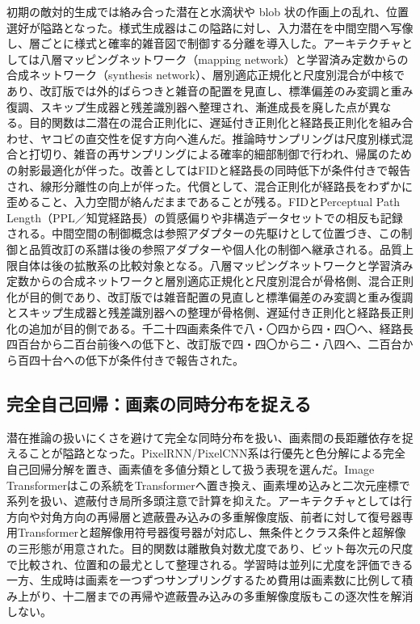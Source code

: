 \documentclass[lualatex,a4paper,10pt]{jlreq}
\begin{document}
初期の敵対的生成では絡み合った潜在と水滴状や blob 状の作画上の乱れ、位置選好が隘路となった。様式生成器はこの隘路に対し、入力潜在を中間空間へ写像し、層ごとに様式と確率的雑音図で制御する分離を導入した\autocite{btd015}。アーキテクチャとしては八層マッピングネットワーク（mapping network）と学習済み定数からの合成ネットワーク（synthesis network）、層別適応正規化と尺度別混合が中核であり、改訂版では外的ばらつきと雑音の配置を見直し、標準偏差のみ変調と重み復調、スキップ生成器と残差識別器へ整理され、漸進成長を廃した点が異なる\autocite{btd016}。目的関数は二潜在の混合正則化に、遅延付き正則化と経路長正則化を組み合わせ、ヤコビの直交性を促す方向へ進んだ\autocite{btd015,btd016}。推論時サンプリングは尺度別様式混合と打切り、雑音の再サンプリングによる確率的細部制御で行われ、帰属のための射影最適化が伴った\autocite{btd015}。改善としてはFIDと経路長の同時低下が条件付きで報告され、線形分離性の向上が伴った\autocite{btd015,btd016}。代償として、混合正則化が経路長をわずかに歪めること、入力空間が絡んだままであることが残る。FIDとPerceptual Path Length（PPL／知覚経路長）の質感偏りや非構造データセットでの相反も記録される。中間空間の制御概念は参照アダプターの先駆けとして位置づき、この制御と品質改訂の系譜は後の参照アダプターや個人化の制御へ継承される。品質上限自体は後の拡散系の比較対象となる。八層マッピングネットワークと学習済み定数からの合成ネットワークと層別適応正規化と尺度別混合が骨格側、混合正則化が目的側であり、改訂版では雑音配置の見直しと標準偏差のみ変調と重み復調とスキップ生成器と残差識別器への整理が骨格側、遅延付き正則化と経路長正則化の追加が目的側である\autocite{btd015,btd016}。千二十四画素条件で八・〇四から四・四〇へ、経路長四百台から二百台前後への低下と、改訂版で四・四〇から二・八四へ、二百台から百四十台への低下が条件付きで報告された\autocite{btd015,btd016}。

\subsection{完全自己回帰：画素の同時分布を捉える}
潜在推論の扱いにくさを避けて完全な同時分布を扱い、画素間の長距離依存を捉えることが隘路となった。PixelRNN/PixelCNN系は行優先と色分解による完全自己回帰分解を置き、画素値を多値分類として扱う表現を選んだ\autocite{btd017}。Image Transformerはこの系統をTransformerへ置き換え、画素埋め込みと二次元座標で系列を扱い、遮蔽付き局所多頭注意で計算を抑えた\autocite{btd018}。アーキテクチャとしては行方向や対角方向の再帰層と遮蔽畳み込みの多重解像度版、前者に対して復号器専用Transformerと超解像用符号器復号器が対応し、無条件とクラス条件と超解像の三形態が用意された\autocite{btd017,btd018}。目的関数は離散負対数尤度であり、ビット毎次元の尺度で比較され、位置和の最尤として整理される\autocite{btd017}。学習時は並列に尤度を評価できる一方、生成時は画素を一つずつサンプリングするため費用は画素数に比例して積み上がり、十二層までの再帰や遮蔽畳み込みの多重解像度版もこの逐次性を解消しない\autocite{btd017}。
\end{document}

